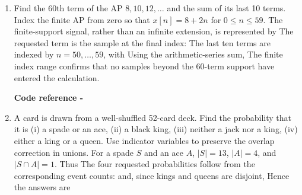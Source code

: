 \begin{enumerate}[label=\thesection.\arabic{subsection}.\arabic{enumi},ref=\arabic{enumi},leftmargin=4mm,itemsep=9pt]
\item \label{question:C10-Q22}\label{question-short:C10-Q22} Find the 60th term of the AP $8,10,12,\ldots$ and the sum of its last 10 terms.
\engsolution
Index the finite AP from zero so that $x[n]=8+2n$ for $0\le n\le59$. The finite-support signal, rather than an infinite extension, is represented by
The requested term is the sample at the final index:
The last ten terms are indexed by $n=50,\ldots,59$, with
Using the arithmetic-series sum,
The finite index range confirms that no samples beyond the 60-term support have entered the calculation.
\par\smallskip\noindent\textbf{Code reference -}\par\noindent{}

\item \label{question:C10-Q28}\label{question-short:C10-Q28} A card is drawn from a well-shuffled 52-card deck. Find the probability that it is (i) a spade or an ace, (ii) a black king, (iii) neither a jack nor a king, (iv) either a king or a queen.
\engsolution
Use indicator variables to preserve the overlap correction in unions. For a spade $S$ and an ace $A$, $|S|=13$, $|A|=4$, and $|S\cap A|=1$. Thus
The four requested probabilities follow from the corresponding event counts:
and, since kings and queens are disjoint,
Hence the answers are


\end{enumerate}
